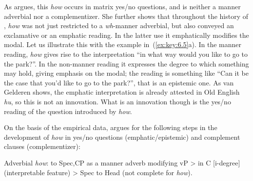 \documentclass[output=paper]{langsci/langscibook}
\begin{document}
As \citeauthor{vanGelderen2015} argues, this \emph{how} occurs in matrix yes/no
questions, and is neither a manner adverbial nor a complementizer. She further
shows that throughout the history of , \emph{how} was not just
restricted to a \emph{wh}-manner adverbial, but also conveyed an exclamative or
an emphatic reading.  In the latter use it emphatically modifies the modal. Let
us illustrate this with the example in~(\ref{ex:key:6.5}a). In the manner reading, \emph{how}
gives rise to the interpretation “in what way would you like to go to the
park?”. In the non-manner reading it expresses the degree to which something
may hold, giving emphasis on the modal; the reading is something like “Can it
be the case that you’d like to go to the park?”, that is an epistemic one. As
van Gelderen shows, the emphatic interpretation is already attested in Old
English \emph{hu}, so this is not an innovation. What is an innovation though
is the yes/no reading of the question introduced by \emph{how}.

On the basis of the empirical data, \citeauthor{vanGelderen2015} argues for the
following steps in the development of \emph{how} in yes/no questions
(emphatic/epistemic) and complement clauses (complementizer):

\ea\label{ex:key:6.6}
	\ea Adverbial \emph{how}:  to Spec,CP as a manner adverb modifying vP >
	\ex {} in C [i-degree] (interpretable feature) >
	\ex Spec to Head (not complete for \emph{how}).
	\z
\z
\end{document}
